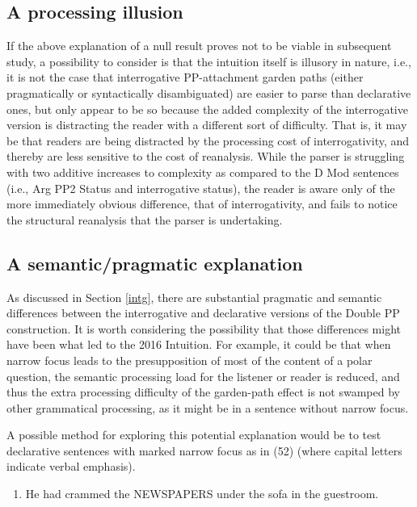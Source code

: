 \documentclass[11pt,oneside]{book}
\providecommand{\tightlist}{%
  \setlength{\itemsep}{0pt}\setlength{\parskip}{0pt}}
\begin{document}
\hypertarget{a-processing-illusion}{%
\subsection{A processing illusion}\label{a-processing-illusion}}

If the above explanation of a null result proves not to be viable in subsequent study, a possibility to consider is that the intuition itself is illusory in nature, i.e., it is not the case that interrogative PP-attachment garden paths (either pragmatically or syntactically disambiguated) are easier to parse than declarative ones, but only appear to be so because the added complexity of the interrogative version is distracting the reader with a different sort of difficulty. That is, it may be that readers are being distracted by the processing cost of interrogativity, and thereby are less sensitive to the cost of reanalysis. While the parser is struggling with two additive increases to complexity as compared to the D Mod sentences (i.e., Arg PP2 Status and interrogative status), the reader is aware only of the more immediately obvious difference, that of interrogativity, and fails to notice the structural reanalysis that the parser is undertaking.

\hypertarget{a-semanticpragmatic-explanation}{%
\subsection{A semantic/pragmatic explanation}\label{a-semanticpragmatic-explanation}}

As discussed in Section \ref{intg}, there are substantial pragmatic and semantic differences between the interrogative and declarative versions of the Double PP construction. It is worth considering the possibility that those differences might have been what led to the 2016 Intuition. For example, it could be that when narrow focus leads to the presupposition of most of the content of a polar question, the semantic processing load for the listener or reader is reduced, and thus the extra processing difficulty of the garden-path effect is not swamped by other grammatical processing, as it might be in a sentence without narrow focus.

A possible method for exploring this potential explanation would be to test declarative sentences with marked narrow focus as in (52) (where capital letters indicate verbal emphasis).

\begin{enumerate}
\def\labelenumi{(\arabic{enumi})}
\setcounter{enumi}{51}
\tightlist
\item
  He had crammed the NEWSPAPERS under the sofa in the guestroom.
\end{enumerate}
\end{document}

